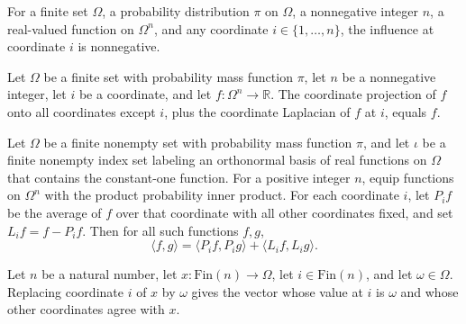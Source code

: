 \begin{theorem}
\label{FABL.productInfluence_nonneg}
\leanok
{}
For a finite set $\Omega$, a probability distribution $\pi$ on $\Omega$, a nonnegative
integer $n$, a real-valued function on $\Omega^n$, and any coordinate
$i\in\{1,\ldots,n\}$, the influence at coordinate $i$ is nonnegative.
\end{theorem}

\begin{theorem}
\label{FABL.coordinateProjection_add_laplacian}
\leanok
{}
Let $\Omega$ be a finite set with probability mass function $\pi$, let $n$ be a
nonnegative integer, let $i$ be a coordinate, and let $f:\Omega^n\to\mathbb R$. The
coordinate projection of $f$ onto all coordinates except $i$, plus the coordinate
Laplacian of $f$ at $i$, equals $f$.
\end{theorem}

\begin{theorem}
\label{FABL.FiniteFourierBasis.productInner_eq_projection_add_laplacian}
\leanok
{}
Let $\Omega$ be a finite nonempty set with probability mass function $\pi$, and let
$\iota$ be a finite nonempty index set labeling an orthonormal basis of real functions
on $\Omega$ that contains the constant-one function. For a positive integer $n$, equip
functions on $\Omega^n$ with the product probability inner product. For each coordinate
$i$, let $P_i f$ be the average of $f$ over that coordinate with all other coordinates
fixed, and set $L_i f=f-P_i f$. Then for all such functions $f,g$,
\[
\langle f,g\rangle=\langle P_i f,P_i g\rangle+\langle L_i f,L_i g\rangle.
\]
\end{theorem}

\begin{definition}
\label{FABL.replaceCoordinate}
\leanok
Let $n$ be a natural number, let $x:\mathrm{Fin}(n)\to\Omega$, let
$i\in\mathrm{Fin}(n)$, and let $\omega\in\Omega$. Replacing coordinate $i$ of $x$ by
$\omega$ gives the vector whose value at $i$ is $\omega$ and whose other coordinates
agree with $x$.
\end{definition}

